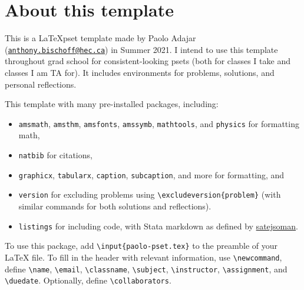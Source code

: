 \documentclass[11pt]{article}
\makeatletter
\newcommand{\email}{anthony.bischoff@hec.ca}
\makeatother
\begin{document}
	
	
	\psetheader
	
	\section*{About this template }
	\begin{problem}
		This is a \LaTeX pset template made by Paolo Adajar (\href{mailto:\email}{\tt \email}) in Summer 2021. I intend to use this template throughout grad school for consistent-looking psets (both for classes I take and classes I am TA for). It includes environments for problems, solutions, and personal reflections.
		
		This template with many pre-installed packages, including:
		\begin{itemize}
			\item \texttt{amsmath}, \texttt{amsthm}, \texttt{amsfonts}, \texttt{amssymb}, \texttt{mathtools}, and \texttt{physics} for formatting math,
			\item \texttt{natbib} for citations,
			\item \texttt{graphicx}, \texttt{tabularx}, \texttt{caption}, \texttt{subcaption}, and more for formatting, and
			\item \texttt{version} for excluding problems using \texttt{\textbackslash excludeversion\{problem\}} (with similar commands for both solutions and reflections).
			\item \texttt{listings} for including code, with Stata markdown as defined by \href{https://github.com/satejsoman/stata-lstlisting}{satejsoman}.
		\end{itemize}
	
		To use this package, add \texttt{\textbackslash input\{paolo-pset.tex\}} to the preamble of your {\LaTeX} file. To fill in the header with relevant information, use \texttt{\textbackslash newcommand}, define \texttt{\textbackslash name}, \texttt{\textbackslash email}, \texttt{\textbackslash classname}, \texttt{\textbackslash subject}, \texttt{\textbackslash instructor}, \texttt{\textbackslash assignment}, and \texttt{\textbackslash duedate}. Optionally, define \texttt{\textbackslash collaborators}.
	\end{problem}
\end{document}

